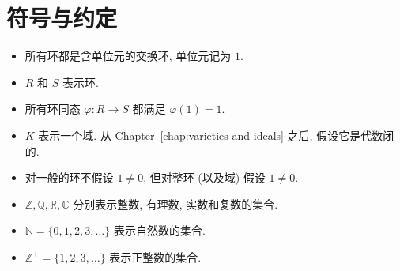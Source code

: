 \chapter*{符号与约定}\label{chap:notation-and-conventions}

\begin{itemize}
  \item 所有环都是含单位元的交换环, 单位元记为 $1$.
  \item $R$ 和 $S$ 表示环.
  \item 所有环同态 $\varphi:R\to S$ 都满足 $\varphi(1)=1$.
  \item $K$ 表示一个域. 从 Chapter~\ref{chap:varieties-and-ideals} 之后, 假设它是代数闭的.
  \item 对一般的环不假设 $1\ne0$, 但对整环 (以及域) 假设 $1\ne0$.
  \item $\mathbb{Z},\mathbb{Q},\mathbb{R},\mathbb{C}$ 分别表示整数, 有理数, 实数和复数的集合.
  \item $\mathbb{N}=\{0,1,2,3,\ldots\}$ 表示自然数的集合.
  \item $\mathbb{Z}^{+}=\{1,2,3,\ldots\}$ 表示正整数的集合.
\end{itemize}

